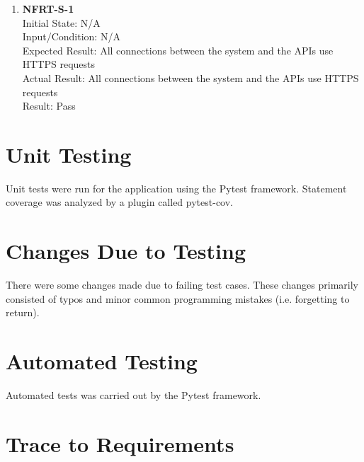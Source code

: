 \documentclass[12pt, titlepage]{article}
\begin{document}
\begin{enumerate}
    \item{\textbf{NFRT-S-1}}\\
    Initial State: N/A\\
    Input/Condition: N/A\\
    Expected Result: All connections between the system and the APIs use HTTPS requests\\
    Actual Result: All connections between the system and the APIs use HTTPS requests\\
    Result: Pass
    
\end{enumerate}


\section{Unit Testing}
Unit tests were run for the application using the Pytest framework. Statement coverage was analyzed by a plugin called pytest-cov.

\section{Changes Due to Testing}
There were some changes made due to failing test cases. These changes primarily consisted of typos and minor common programming mistakes (i.e. forgetting to return).

\section{Automated Testing}
Automated tests was carried out by the Pytest framework.

\section{Trace to Requirements}
\end{document}
